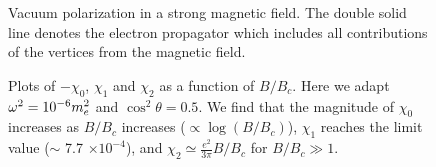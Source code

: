 \begin{figure}
   \begin{center}
     \centerline{}
       \caption{%
       Vacuum polarization in a strong magnetic field. The double
       solid line denotes the electron propagator which includes all
       contributions of the vertices from the  magnetic field.
       }
       \label{fig:vac_mag}
   \end{center}
\end{figure}
%
\newpage
\begin{figure}
   \begin{center}
     \centerline{}
       \caption{%
       Plots of $-\chi_0$, $\chi_1$ and $\chi_2$ as a function of
       $B/B_c$.  Here we adapt $\omega^2 = 10^{-6} m_e^2$ and
       $\cos^2\theta = 0.5$. We find that the magnitude of $\chi_0$
       increases as $B/B_c$ increases ($\propto \log(B/B_c)$),
       $\chi_1$ reaches the limit value ($\sim$ 7.7 $\times 10^{-4}$),
       and $\chi_2 \simeq \frac{e^2}{3\pi}B/B_c$ for $B/B_c \gg 1$.  }
       \label{fig:chi012}
   \end{center}
\end{figure}
%
%
